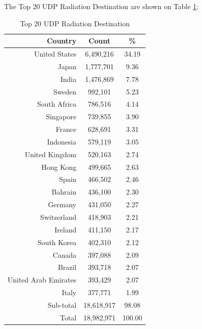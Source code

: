 \newpage
The Top 20 UDP Radiation Destination are shown on Table \ref{tab:top20udpradiationdestination}:
\begin{table}[!h]
\begin{center}
\caption{Top 20 UDP Radiation Destination}
\label{tab:top20udpradiationdestination}
\begin{tabular}{ |r|c|c| }
\hline
\centering Country & Count & \%  \\
\hline
United States & 6,490,216 & 34.19  \\
Japan & 1,777,701 & 9.36  \\
India & 1,476,869 & 7.78  \\
Sweden & 992,101 & 5.23  \\
South Africa & 786,516 & 4.14  \\
Singapore & 739,855 & 3.90  \\
France & 628,691 & 3.31  \\
Indonesia & 579,119 & 3.05  \\
United Kingdom & 520,163 & 2.74  \\
Hong Kong & 499,665 & 2.63  \\
Spain & 466,502 & 2.46  \\
Bahrain & 436,100 & 2.30  \\
Germany & 431,050 & 2.27  \\
Switzerland & 418,903 & 2.21  \\
Ireland & 411,150 & 2.17  \\
South Korea & 402,310 & 2.12  \\
Canada & 397,088 & 2.09  \\
Brazil & 393,718 & 2.07  \\
United Arab Emirates & 393,429 & 2.07  \\
Italy & 377,771 & 1.99  \\
\hline
Sub-total & 18,618,917 & 98.08  \\
\hline
Total & 18,982,971 & 100.00  \\
\hline
\end{tabular}
\end{center}
\end{table}

